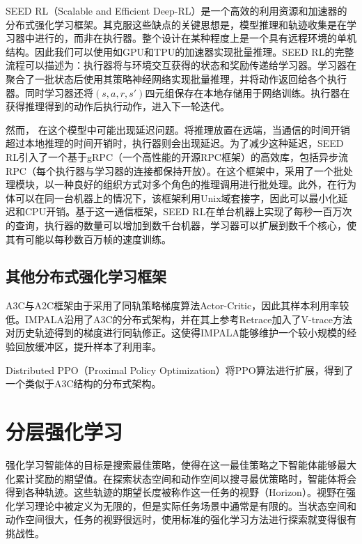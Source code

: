 SEED RL（Scalable and Efficient Deep-RL）\cite{espeholt2019seed}是一个高效的利用资源和加速器的分布式强化学习框架。其克服这些缺点的关键思想是，模型推理和轨迹收集是在学习器中进行的，而非在执行器。整个设计在某种程度上是一个具有远程环境的单机结构。因此我们可以使用如GPU和TPU的加速器实现批量推理。SEED RL的完整流程可以描述为：执行器将与环境交互获得的状态和奖励传递给学习器。学习器在聚合了一批状态后使用其策略神经网络实现批量推理，并将动作返回给各个执行器。同时学习器还将$(s,a,r,s')$四元组保存在本地存储用于网络训练。执行器在获得推理得到的动作后执行动作，进入下一轮迭代。

然而， 在这个模型中可能出现延迟问题。将推理放置在远端，当通信的时间开销超过本地推理的时间开销时，执行器则会出现延迟。为了减少这种延迟，SEED RL引入了一个基于gRPC（一个高性能的开源RPC框架）的高效库，包括异步流RPC（每个执行器与学习器的连接都保持开放）。在这个框架中，采用了一个批处理模块，以一种良好的组织方式对多个角色的推理调用进行批处理。此外，在行为体可以在同一台机器上的情况下，该框架利用Unix域套接字，因此可以最小化延迟和CPU开销。基于这一通信框架，SEED RL在单台机器上实现了每秒一百万次的查询，执行器的数量可以增加到数千台机器，学习器可以扩展到数千个核心，使其有可能以每秒数百万帧的速度训练。

\subsection{其他分布式强化学习框架}

A3C与A2C框架由于采用了同轨策略梯度算法Actor-Critic，因此其样本利用率较低。IMPALA\cite{espeholt2018impala}沿用了A3C的分布式架构，并在其上参考Retrace\cite{munos2016safe}加入了V-trace方法对历史轨迹得到的梯度进行同轨修正。这使得IMPALA能够维护一个较小规模的经验回放缓冲区，提升样本了利用率。

Distributed PPO（Proximal Policy Optimization）\cite{heess2017emergence}将PPO\cite{schulman2017proximal}算法进行扩展，得到了一个类似于A3C结构的分布式架构。

\section{分层强化学习}

强化学习智能体的目标是搜索最佳策略，使得在这一最佳策略之下智能体能够最大化累计奖励的期望值。在探索状态空间和动作空间以搜寻最优策略时，智能体将会得到各种轨迹。这些轨迹的期望长度被称作这一任务的视野（Horizon）。视野在强化学习理论中被定义为无限的，但是实际任务场景中通常是有限的。当状态空间和动作空间很大，任务的视野很远时，使用标准的强化学习方法进行探索就变得很有挑战性。


